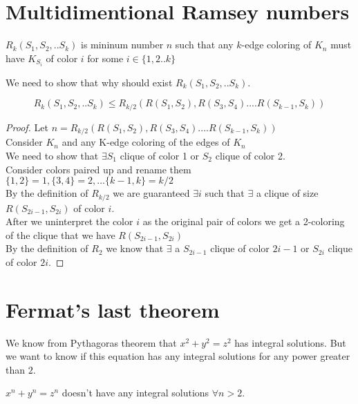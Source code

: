 
\section{Multidimentional Ramsey numbers}
\begin{definition}
$R_k(S_1,S_2,..S_k)$ is mininum number $n$ such that any $k$-edge coloring of $K_n$ must have $K_{S_i}$ of color $i$ for some $i \in \{1,2..k\}$
\end{definition}
We need to show that why should exist $R_k(S_1,S_2,..S_k)$.
\begin{claim}
$$R_k(S_1,S_2,..S_k) \leq R_{k/2}(R(S_1,S_2), R(S_3,S_4).... R(S_{k-1},S_k))$$
\end{claim}
\begin{proof}
Let $n =  R_{k/2}(R(S_1,S_2), R(S_3,S_4).... R(S_{k-1},S_k))$\\
Consider $K_n$ and any K-edge coloring of the edges of $K_n$\\

We need to show that $\exists S_1$ clique of color 1 or $S_2$ clique of color 2.\\
Consider colors paired up and rename them $\{1,2\} = 1, \{3,4\} = 2, ... \{k-1,k\} = k/2$ \\
By the definition of $R_{k/2}$ we are guaranteed $\exists i$ such that $\exists$ a clique of size $R(S_{2i-1},S_{2i})$ of color $i$.\\

After we uninterpret the color $i$ as the original pair of colors we get a 2-coloring of the clique that we have $R(S_{2i-1},S_{2i})$\\
By the definition of $R_2$ we know that $\exists$ a $S_{2i-1}$ clique of color $2i-1$ or $S_{2i}$ clique of color $2i$.
\end{proof}

\section{Fermat's last theorem}
We know from Pythagoras theorem that $x^2 +y^2 = z^2$ has integral solutions. But we want to know if this equation has any integral solutions for any power greater than $2$.
\begin{theorem}
$x^n +y^n = z^n$ doesn't have any integral solutions $\forall n>2$.
\end{theorem}


